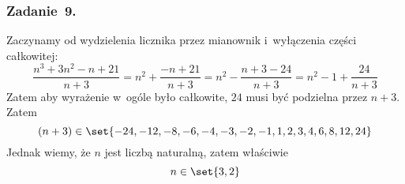 \subsubsection*{Zadanie~9.}
Zaczynamy od wydzielenia licznika przez mianownik i~wyłączenia części całkowitej:
\begin{equation*}
    \frac{n^3 + 3n^2 - n + 21}{n + 3}
        = n^2 + \frac{-n + 21}{n + 3}
        = n^2 - \frac{n + 3 - 24}{n + 3}
        = n^2 - 1 + \frac{24}{n+3}
\end{equation*}
Zatem aby wyrażenie w~ogóle było całkowite, \(24\) musi być podzielna przez \(n + 3\). Zatem
\begin{equation*}
    (n + 3) \in \set{-24, -12, -8, -6, -4, -3, -2, -1, 1, 2, 3, 4, 6, 8, 12, 24}
\end{equation*}
Jednak wiemy, że \(n\) jest liczbą naturalną, zatem właściwie
\begin{equation*}
    n \in \set{3, 2}
\end{equation*}

